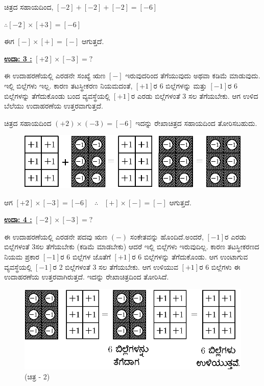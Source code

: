 ಚಿತ್ರದ ಸಹಾಯದಿಂದ, $[-2] + [-2] + [-2] = [-6]$

$\therefore [-2] \times [+3] = [-6]$

ಈಗ $[-] \times [+] = [-]$ ಆಗುತ್ತದೆ.

\noindent
{\textbf{\underline{ಉದಾ: 3 :}}} $[+2] \times [-3] = ?$

ಈ ಉದಾಹರಣೆಯಲ್ಲಿ ಎರಡನೇ ಸಂಖ್ಯೆ ಋಣ $[-]$ ಇರುವುದರಿಂದ ತೆಗೆಯುವುದು ಅಥವಾ ಕಡಿಮೆ ಮಾಡುವುದು. ಇಲ್ಲಿ ಬಿಲ್ಲೆಗಳು ಇಲ್ಲ. ಕಾರಣ ತಟಸ್ಥೀಕರಣ ನಿಯಮದಂತೆ, $[+1]$ರ 6 ಬಿಲ್ಲೆಗಳನ್ನು ಮತ್ತು $[-1]$ರ 6 ಬಿಲ್ಲೆಗಳನ್ನು ತೆಗೆದುಕೊಂಡು ಬಂದ ವ್ಯವಸ್ಥೆಯಲ್ಲಿ $[+1]$ರ ಎರಡು ಬಿಲ್ಲೆಗಳಂತೆ 3 ಸಲ ತೆಗೆಯಬೇಕು. ಆಗ ಉಳಿದ ಬೆಲೆಯು ಉದಾಹರಣೆಯ ಉತ್ತರವಾಗುತ್ತದೆ.

ಚಿತ್ರದ ಸಹಾಯದಿಂದ $(+2) \times (-3) = [-6]$ ಇದನ್ನು ರೇಖಾಚಿತ್ರದ ಸಹಾಯದಿಂದ ತೋರಿಸಬಹುದು. 
\begin{figure}[H]
\centering
\includegraphics[scale=0.8]{src/figure/chap3/fig3-20b.eps}
\end{figure}

ಆಗ $[+2]\times [-3]=[-6]$ \ $\therefore$ \ $[+]\times [-]=[-]$ ಆಗುತ್ತದೆ.

\noindent
{\textbf{\underline{ಉದಾ: 4 :}}} $[-2] \times [-3] = ?$

ಈ ಉದಾಹರಣೆಯಲ್ಲಿ ಎರಡನೇ ಪದವು ಋಣ $(-)$ ಸಂಕೇತವನ್ನು ಹೊಂದಿದೆ.\break ಅಂದರೆ, $[-1]$ರ ಎರಡು ಬಿಲ್ಲೆಗಳಂತೆ 3ಸಲ ತೆಗೆಯಬೇಕು (ಕಡಿಮೆ ಮಾಡಬೇಕು) ಆದರೆ ಇಲ್ಲಿ ಬಿಲ್ಲೆಗಳು ಇರುವುದಿಲ್ಲ. ಕಾರಣ ತಟಸ್ಥೀಕರಣದ ನಿಯಮ ಪ್ರಕಾರ $[-1]$ರ 6 ಬಿಲ್ಲೆಗಳ ಜೊತೆಗೆ $[+1]$ರ 6 ಬಿಲ್ಲೆಗಳನ್ನು ತೆಗೆದುಕೊಂಡು. ಆಗ ಉಂಟಾಗುವ ವ್ಯವಸ್ಥೆಯಲ್ಲಿ $[-1]$ರ 2 ಬಿಲ್ಲೆಗಳಂತೆ 3 ಸಲ ತೆಗೆಯಬೇಕು. ಆಗ ಉಳಿಯುವ $[+1]$ರ 6 ಬಿಲ್ಲೆಗಳು ಈ ಉದಾ\break ಹರಣೆಯ ಉತ್ತರವಾಗಿರುತ್ತದೆ. ಇದನ್ನು ರೇಖಾಚಿತ್ರದಿಂದ ತೋರಿಸಿದೆ.

\begin{figure}[H]
\centering
\includegraphics[scale=0.8]{src/figure/chap3/fig3-21b.eps}
(ಚಿತ್ರ - 2)
\end{figure}

